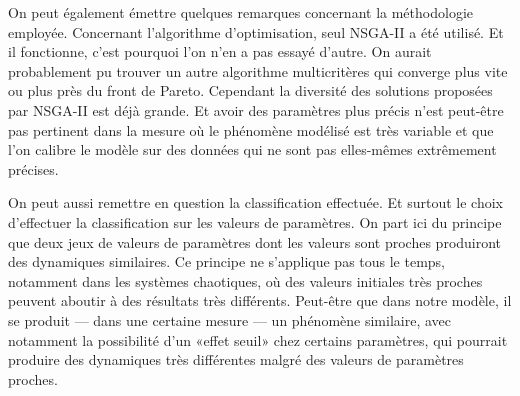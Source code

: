 On peut également émettre quelques remarques concernant la méthodologie employée.
Concernant l'algorithme d'optimisation, seul NSGA-II a été utilisé.
Et il fonctionne, c'est pourquoi l'on n'en a pas essayé d'autre.
On aurait probablement pu trouver un autre algorithme multicritères qui converge plus vite ou plus près du front de Pareto.
Cependant la diversité des solutions proposées par NSGA-II est déjà grande.
Et avoir des paramètres plus précis n'est peut-être pas pertinent dans la mesure où le phénomène modélisé est très variable et que l'on calibre le modèle sur des données qui ne sont pas elles-mêmes extrêmement précises.

On peut aussi remettre en question la classification effectuée.
Et surtout le choix d'effectuer la classification sur les valeurs de paramètres.
On part ici du principe que deux jeux de valeurs de paramètres dont les valeurs sont proches produiront des dynamiques similaires.
Ce principe ne s'applique pas tous le temps, notamment dans les systèmes chaotiques, où des valeurs initiales très proches peuvent aboutir à des résultats très différents.
Peut-être que dans notre modèle, il se produit --- dans une certaine mesure --- un phénomène similaire, avec notamment la possibilité d'un «effet seuil» chez certains paramètres, qui pourrait produire des dynamiques très différentes malgré des valeurs de paramètres proches.

